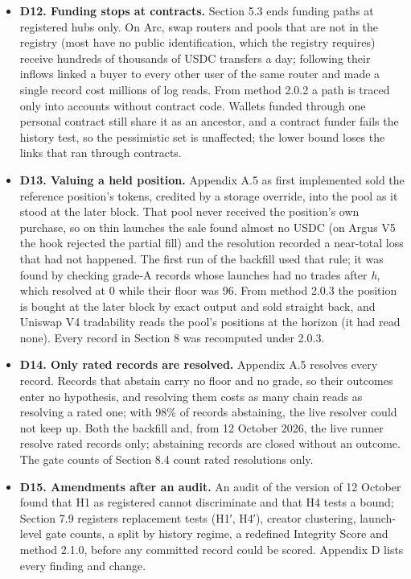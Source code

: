 \begin{itemize}
\item
  \textbf{D12. Funding stops at contracts.} Section 5.3 ends funding paths at registered hubs only. On Arc, swap routers and pools that are not in the registry (most have no public identification, which the registry requires) receive hundreds of thousands of USDC transfers a day; following their inflows linked a buyer to every other user of the same router and made a single record cost millions of log reads. From method 2.0.2 a path is traced only into accounts without contract code. Wallets funded through one personal contract still share it as an ancestor, and a contract funder fails the history test, so the pessimistic set is unaffected; the lower bound loses the links that ran through contracts.
\item
  \textbf{D13. Valuing a held position.} Appendix A.5 as first implemented sold the reference position's tokens, credited by a storage override, into the pool as it stood at the later block. That pool never received the position's own purchase, so on thin launches the sale found almost no USDC (on Argus V5 the hook rejected the partial fill) and the resolution recorded a near-total loss that had not happened. The first run of the backfill used that rule; it was found by checking grade-A records whose launches had no trades after \emph{h}, which resolved at 0 while their floor was 96. From method 2.0.3 the position is bought at the later block by exact output and sold straight back, and Uniswap V4 tradability reads the pool's positions at the horizon (it had read none). Every record in Section 8 was recomputed under 2.0.3.
\item
  \textbf{D14. Only rated records are resolved.} Appendix A.5 resolves every record. Records that abstain carry no floor and no grade, so their outcomes enter no hypothesis, and resolving them costs as many chain reads as resolving a rated one; with 98\% of records abstaining, the live resolver could not keep up. Both the backfill and, from 12 October 2026, the live runner resolve rated records only; abstaining records are closed without an outcome. The gate counts of Section 8.4 count rated resolutions only.
\item
  \textbf{D15. Amendments after an audit.} An audit of the version of 12 October found that H1 as registered cannot discriminate and that H4 tests a bound; Section 7.9 registers replacement tests (H1′, H4′), creator clustering, launch-level gate counts, a split by history regime, a redefined Integrity Score and method 2.1.0, before any committed record could be scored. Appendix D lists every finding and change.
\end{itemize}

